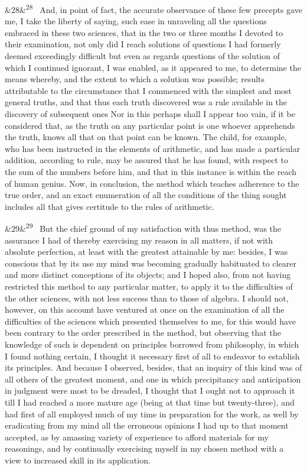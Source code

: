\documentclass[12pt]{article}
\newcommand{\para}[1][]{\par\noindent\ifx&#1&\else\textsuperscript{\footnotesize #1}~\fi}
\begin{document}
\para[28] And, in point of fact, the accurate observance of these few precepts gave me, I take the liberty of saying, such ease in unraveling all the questions embraced in these two sciences, that in the two or three months I devoted to their examination, not only did I reach solutions of questions I had formerly deemed exceedingly difficult but even as regards questions of the solution of which I continued ignorant, I was enabled, as it appeared to me, to determine the means whereby, and the extent to which a solution was possible; results attributable to the circumstance that I commenced with the simplest and most general truths, and that thus each truth discovered was a rule available in the discovery of subsequent ones Nor in this perhaps shall I appear too vain, if it be considered that, as the truth on any particular point is one whoever apprehends the truth, knows all that on that point can be known. The child, for example, who has been instructed in the elements of arithmetic, and has made a particular addition, according to rule, may be assured that he has found, with respect to the sum of the numbers before him, and that in this instance is within the reach of human genius. Now, in conclusion, the method which teaches adherence to the true order, and an exact enumeration of all the conditions of the thing sought includes all that gives certitude to the rules of arithmetic.

\para[29] But the chief ground of my satisfaction with thus method, was the assurance I had of thereby exercising my reason in all matters, if not with absolute perfection, at least with the greatest attainable by me: besides, I was conscious that by its use my mind was becoming gradually habituated to clearer and more distinct conceptions of its objects; and I hoped also, from not having restricted this method to any particular matter, to apply it to the difficulties of the other sciences, with not less success than to those of algebra. I should not, however, on this account have ventured at once on the examination of all the difficulties of the sciences which presented themselves to me, for this would have been contrary to the order prescribed in the method, but observing that the knowledge of such is dependent on principles borrowed from philosophy, in which I found nothing certain, I thought it necessary first of all to endeavor to establish its principles. And because I observed, besides, that an inquiry of this kind was of all others of the greatest moment, and one in which precipitancy and anticipation in judgment were most to be dreaded, I thought that I ought not to approach it till I had reached a more mature age (being at that time but twenty-three), and had first of all employed much of my time in preparation for the work, as well by eradicating from my mind all the erroneous opinions I had up to that moment accepted, as by amassing variety of experience to afford materials for my reasonings, and by continually exercising myself in my chosen method with a view to increased skill in its application.
\end{document}
